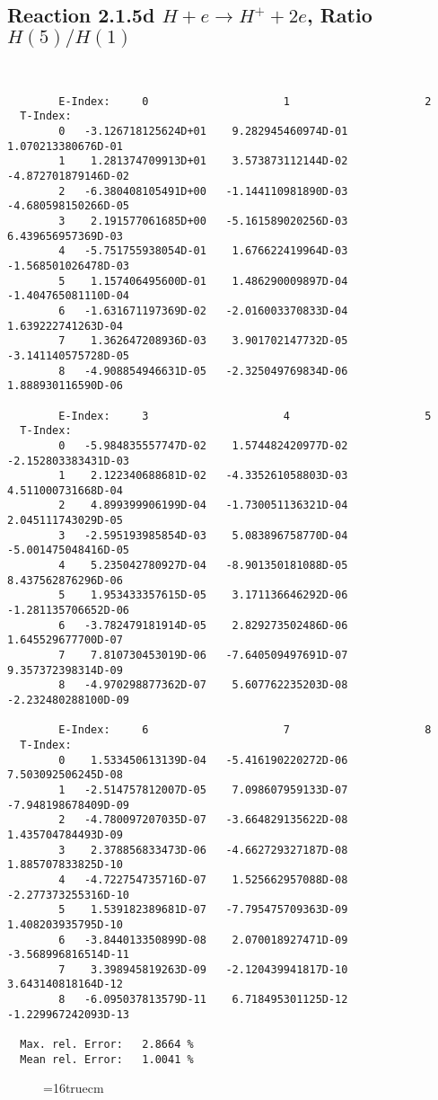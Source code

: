 \documentclass[12pt,dvipdfmx]{article}
\begin{document}
\newpage
\subsection{
Reaction 2.1.5d  $H + e \rightarrow H^+ + 2e$, Ratio $H(5)/H(1)$
}


\begin{small}\begin{verbatim}


        E-Index:     0                     1                     2
  T-Index:
        0   -3.126718125624D+01    9.282945460974D-01    1.070213380676D-01
        1    1.281374709913D+01    3.573873112144D-02   -4.872701879146D-02
        2   -6.380408105491D+00   -1.144110981890D-03   -4.680598150266D-05
        3    2.191577061685D+00   -5.161589020256D-03    6.439656957369D-03
        4   -5.751755938054D-01    1.676622419964D-03   -1.568501026478D-03
        5    1.157406495600D-01    1.486290009897D-04   -1.404765081110D-04
        6   -1.631671197369D-02   -2.016003370833D-04    1.639222741263D-04
        7    1.362647208936D-03    3.901702147732D-05   -3.141140575728D-05
        8   -4.908854946631D-05   -2.325049769834D-06    1.888930116590D-06

        E-Index:     3                     4                     5
  T-Index:
        0   -5.984835557747D-02    1.574482420977D-02   -2.152803383431D-03
        1    2.122340688681D-02   -4.335261058803D-03    4.511000731668D-04
        2    4.899399906199D-04   -1.730051136321D-04    2.045111743029D-05
        3   -2.595193985854D-03    5.083896758770D-04   -5.001475048416D-05
        4    5.235042780927D-04   -8.901350181088D-05    8.437562876296D-06
        5    1.953433357615D-05    3.171136646292D-06   -1.281135706652D-06
        6   -3.782479181914D-05    2.829273502486D-06    1.645529677700D-07
        7    7.810730453019D-06   -7.640509497691D-07    9.357372398314D-09
        8   -4.970298877362D-07    5.607762235203D-08   -2.232480288100D-09

        E-Index:     6                     7                     8
  T-Index:
        0    1.533450613139D-04   -5.416190220272D-06    7.503092506245D-08
        1   -2.514757812007D-05    7.098607959133D-07   -7.948198678409D-09
        2   -4.780097207035D-07   -3.664829135622D-08    1.435704784493D-09
        3    2.378856833473D-06   -4.662729327187D-08    1.885707833825D-10
        4   -4.722754735716D-07    1.525662957088D-08   -2.277373255316D-10
        5    1.539182389681D-07   -7.795475709363D-09    1.408203935795D-10
        6   -3.844013350899D-08    2.070018927471D-09   -3.568996816514D-11
        7    3.398945819263D-09   -2.120439941817D-10    3.643140818164D-12
        8   -6.095037813579D-11    6.718495301125D-12   -1.229967242093D-13

  Max. rel. Error:   2.8664 %
  Mean rel. Error:   1.0041 %

\end{verbatim}\end{small}
\begin{figure} \label{2.1.5d}
\epsfxsize=16truecm
\end{figure}
\end{document}
